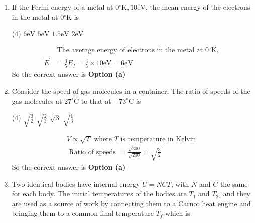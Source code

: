\begin{enumerate}
 \begin{tasks}(1)
	\task[\textbf{a.}]Lies below the donor level
	\task[\textbf{b.}]Lies in the conduction band
	\task[\textbf{c.}]Lies half-way between the conduction band and donor level
	\task[\textbf{d.}] Coincides with the intrinsic Fermi level
\end{tasks}
\begin{answer}
	The Fermilevel in an $n$-type semiconductor at $0{ }^{\circ} \mathrm{K}$ lies half-way between the conduction band and donor level.\\
	So the corrext answer is \textbf{Option (c)}
\end{answer}
\item If the Fermi energy of a metal at $0{ }^{\circ} \mathrm{K}, 10 \mathrm{eV}$, the mean energy of the electrons in the metal at $0{ }^{\circ} \mathrm{K}$ is
 \begin{tasks}(4)
	\task[\textbf{a.}]$6 \mathrm{eV}$
	\task[\textbf{b.}] $5 \mathrm{eV}$
	\task[\textbf{c.}]$1.5 \mathrm{eV}$
	\task[\textbf{d.}]  $2 \mathrm{eV}$
\end{tasks}
\begin{answer}
	$$
	\begin{aligned}
		&\text { The average energy of electrons in the metal at } 0{ }^{\circ} \mathrm{K} \text {, }\\
		\vec{E}&=\frac{3}{5} E_{f}=\frac{3}{5} \times 10 \mathrm{eV}=6 \mathrm{eV}
\end{aligned}
$$
	So the corrext answer is \textbf{Option (a)}
\end{answer}
\item Consider the speed of gas molecules in a container. The ratio of speeds of the gas molecules at $27^{\circ} \mathrm{C}$ to that at $-73^{\circ} \mathrm{C}$ is
 \begin{tasks}(4)
	\task[\textbf{a.}]$\sqrt{\frac{3}{2}}$
	\task[\textbf{b.}]$\sqrt{\frac{2}{3}}$
	\task[\textbf{c.}] $\sqrt{3}$
	\task[\textbf{d.}] $\sqrt{\frac{1}{3}}$
\end{tasks}
\begin{answer}
	$$
	\begin{aligned}
	V \propto \sqrt{T} \text { where } T \text { is temperature in Kelvin }\\
	\text { Ratio of speeds }=\frac{\sqrt{300}}{\sqrt{200}}=\sqrt{\frac{3}{2}}
\end{aligned}
$$
	So the corrext answer is \textbf{Option (a)}
\end{answer}
\item Two identical bodies have internal energy $U=N C T$, with $N$ and $C$ the same for each body. The initial temperatures of the bodies are $T_{1}$ and $T_{2}$, and they are used as a source of work by connecting them to a Carnot heat engine and bringing them to a common final temperature $T_{f}$ which is

\end{enumerate}
